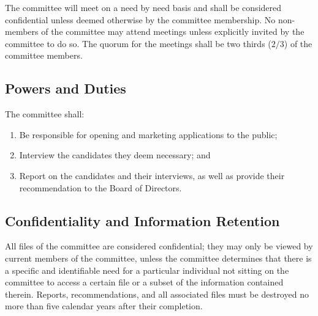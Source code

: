 The committee will meet on a need by need basis and shall be considered confidential unless deemed otherwise by the committee membership.
No non-members of the committee may attend meetings unless explicitly invited by the committee to do so.
The quorum for the meetings shall be two thirds ($2/3$) of the committee members.

\subsection{Powers and Duties}

The committee shall:
\begin{enumerate}
	\item Be responsible for opening and marketing applications to the public;
	\item Interview the candidates they deem necessary; and
	\item Report on the candidates and their interviews, as well as provide their recommendation to the Board of Directors.
\end{enumerate}

\subsection{Confidentiality and Information Retention}

All files of the committee are considered confidential; they may only be viewed by current members of the committee, unless the committee determines that there is a specific and identifiable need for a particular individual not sitting on the committee to access a certain file or a subset of the information contained therein.
Reports, recommendations, and all associated files must be destroyed no more than five calendar years after their completion.
